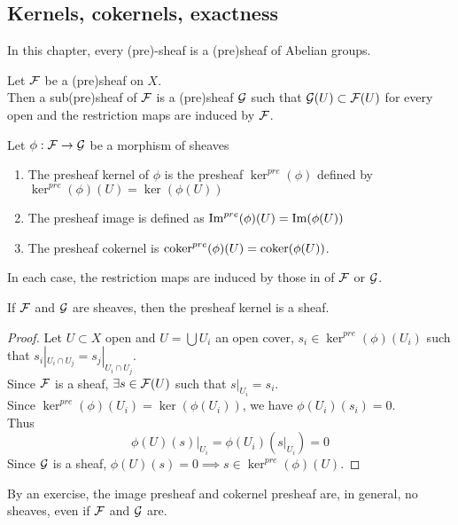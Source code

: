\documentclass[../main.tex]{subfiles}
\begin{document}
\subsection{Kernels, cokernels, exactness}
In this chapter, every (pre)-sheaf is a (pre)sheaf of Abelian groups.\\
\begin{defn}[Subsheaf]
	Let $\mathcal{F}$ be a (pre)sheaf on $X$.\\
	Then a sub(pre)sheaf of $\mathcal{F}$ is a (pre)sheaf $\mathcal{G}$ such that $\mathcal{G}( U) \subset \mathcal{F}( U) $ for every open and the restriction maps are induced by $\mathcal{F}$.
\end{defn}
\begin{defn}
Let $\phi:\mathcal{F}\to \mathcal{G}$ be a morphism of sheaves
\begin{enumerate}
\item The presheaf kernel of $\phi$ is the presheaf $\ker^{pre}( \phi) $ defined by $\ker^{pre}( \phi) ( U)= \ker( \phi( U) )  $ 
\item The presheaf image is defined as $\operatorname{Im}^{pre}( \phi) ( U) = \operatorname{Im} ( \phi( U) ) $ 
\item The presheaf cokernel is $\operatorname{coker}^{pre}( \phi) ( U) = \operatorname{coker}( \phi( U) ) $.
\end{enumerate}
In each case, the restriction maps are induced by those in of $\mathcal{F}$ or $\mathcal{G}$.

\end{defn}
\begin{lemma}
If $\mathcal{F}$ and $\mathcal{G}$ are sheaves, then the presheaf kernel is a sheaf.
\end{lemma}
\begin{proof}
Let $U \subset X$ open and $U = \bigcup U_i$ an open cover, $s_i \in \ker^{pre}( \phi)( U_i)  $ such that $s_i|_{U_i\cap U_j }= s_j |_{U_i\cap U_j}  $.\\
Since $\mathcal{F}$ is a sheaf, $\exists s \in \mathcal{F}( U) $ such that $s|_{U_i} = s_i$.\\
Since $\ker^{pre}( \phi) ( U_i) = \ker( \phi( U_i) ) $, we have $\phi( U_i) ( s_i) =0$.\\
Thus
\[ 
\phi( U) ( s) |_{U_i} = \phi( U_i) ( s|_{U_i} ) = 0
\]
Since $\mathcal{G}$ is a sheaf, $\phi( U) ( s) =0 \implies s \in \ker^{pre}( \phi) ( U) $.
\end{proof}
\begin{exemple}
By an exercise, the image presheaf and cokernel presheaf are, in general, no sheaves, even if $\mathcal{F}$ and $\mathcal{G}$ are.
\end{exemple}
\end{document}
